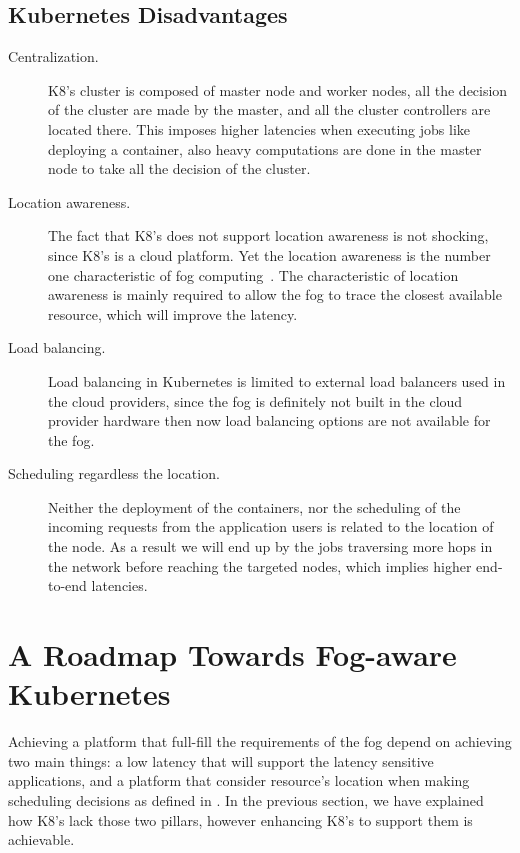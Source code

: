 \documentclass[letterpaper,twocolumn,10pt]{article}
\begin{document}
\subsection{Kubernetes Disadvantages}

\begin{description}
\item[Centralization.]  K8's cluster is composed of master node and
  worker nodes, all the decision of the cluster are made by the
  master, and all the cluster controllers are located there. This
  imposes higher latencies when executing jobs like deploying a
  container, also heavy computations are done in the master node to
  take all the decision of the cluster.

\item[Location awareness.]  The fact that K8's does not support
  location awareness is not shocking, since K8's is a cloud
  platform. Yet the location awareness is the number one
  characteristic of fog
  computing~\cite{Bonomi:2012:FCR:2342509.2342513}.  The
  characteristic of location awareness is mainly required to allow the
  fog to trace the closest available resource, which will improve the
  latency.

\item[Load balancing.]  Load balancing in Kubernetes is limited to
  external load balancers used in the cloud providers, since the fog
  is definitely not built in the cloud provider hardware then now load
  balancing options are not available for the fog.

\item[Scheduling regardless the location.] Neither the deployment of
  the containers, nor the scheduling of the incoming requests from the
  application users is related to the location of the node. As a
  result we will end up by the jobs traversing more hops in the
  network before reaching the targeted nodes, which implies higher
  end-to-end latencies.


\end{description}

\section{A Roadmap Towards Fog-aware Kubernetes}\label{sec:road}

Achieving a platform that full-fill the requirements of the fog depend on achieving two main things: a low latency that will support the latency sensitive applications, and a platform that consider resource's location when making scheduling decisions as defined in \cite{Bonomi:2012:FCR:2342509.2342513}. In the previous section, we have explained how K8's lack those two pillars, however enhancing K8's to support them is achievable.
\end{document}
